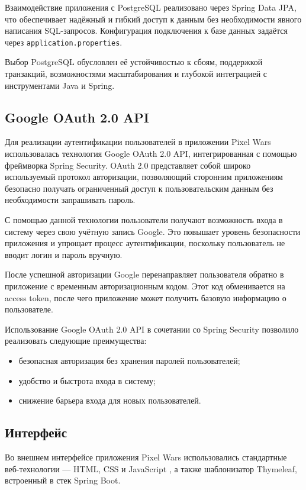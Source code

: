 Взаимодействие приложения с PostgreSQL реализовано через Spring Data JPA, что обеспечивает надёжный и гибкий доступ к данным без необходимости явного написания SQL-запросов. Конфигурация подключения к базе данных задаётся через \texttt{application.properties}.

Выбор PostgreSQL обусловлен её устойчивостью к сбоям, поддержкой транзакций, возможностями масштабирования и глубокой интеграцией с инструментами Java и Spring.

\subsection{Google OAuth 2.0 API}

Для реализации аутентификации пользователей в приложении Pixel Wars использовалась технология Google OAuth 2.0 API, интегрированная с помощью фреймворка Spring Security. OAuth 2.0 представляет собой широко используемый протокол авторизации, позволяющий сторонним приложениям безопасно получать ограниченный доступ к пользовательским данным без необходимости запрашивать пароль.

С помощью данной технологии пользователи получают возможность входа в систему через свою учётную запись Google. Это повышает уровень безопасности приложения и упрощает процесс аутентификации, поскольку пользователь не вводит логин и пароль вручную.

После успешной авторизации Google перенаправляет пользователя обратно в приложение с временным авторизационным кодом. Этот код обменивается на access token, после чего приложение может получить базовую информацию о пользователе.

Использование Google OAuth 2.0 API в сочетании со Spring Security позволило реализовать следующие преимущества:
\begin{itemize}
    \item безопасная авторизация без хранения паролей пользователей;
    \item удобство и быстрота входа в систему;
    \item снижение барьера входа для новых пользователей.
\end{itemize}

\subsection{Интерфейс}

Во внешнем интерфейсе приложения Pixel Wars использовались стандартные веб-технологии — HTML, CSS и JavaScript \cite{mdn}, а также шаблонизатор Thymeleaf, встроенный в стек Spring Boot.

